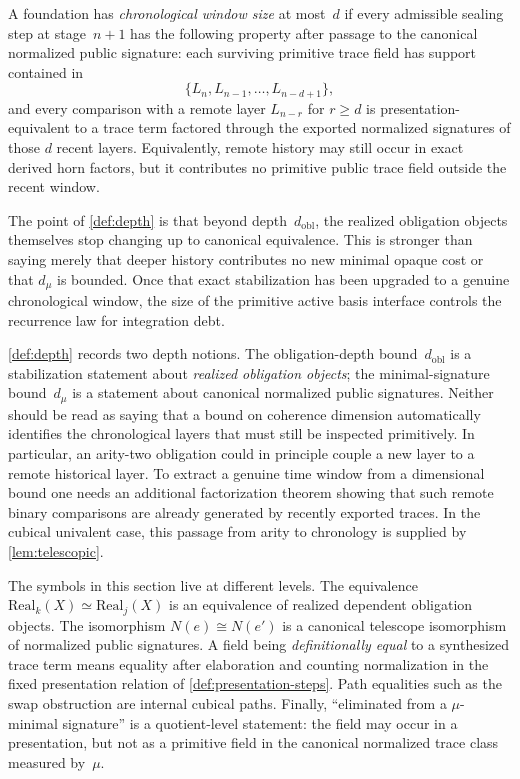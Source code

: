 \documentclass{lmcs}
\newcommand{\Real}{\mathrm{Real}}
\begin{document}
\begin{defi}
\label{def:chronological-window}
A foundation has \emph{chronological window size} at most~$d$ if every admissible sealing step at stage~$n+1$ has the following property after passage to the canonical normalized public signature: each surviving primitive trace field has support contained in
\[
  \{L_n,L_{n-1},\dots,L_{n-d+1}\},
\]
and every comparison with a remote layer $L_{n-r}$ for $r\geq d$ is presentation-equivalent to a trace term factored through the exported normalized signatures of those $d$ recent layers. Equivalently, remote history may still occur in exact derived horn factors, but it contributes no primitive public trace field outside the recent window.
\end{defi}

The point of \autoref{def:depth} is that beyond depth~$d_{\mathrm{obl}}$, the realized obligation objects themselves stop changing up to canonical equivalence. This is stronger than saying merely that deeper history contributes no new minimal opaque cost or that $d_\mu$ is bounded. Once that exact stabilization has been upgraded to a genuine chronological window, the size of the primitive active basis interface controls the recurrence law for integration debt.

\begin{rem}
\label{rem:arity-vs-chronology}
\autoref{def:depth} records two depth notions. The obligation-depth bound~$d_{\mathrm{obl}}$ is a stabilization statement about \emph{realized obligation objects}; the minimal-signature bound~$d_\mu$ is a statement about canonical normalized public signatures. Neither should be read as saying that a bound on coherence dimension automatically identifies the chronological layers that must still be inspected primitively. In particular, an arity-two obligation could in principle couple a new layer to a remote historical layer. To extract a genuine time window from a dimensional bound one needs an additional factorization theorem showing that such remote binary comparisons are already generated by recently exported traces. In the cubical univalent case, this passage from arity to chronology is supplied by \autoref{lem:telescopic}.
\end{rem}

\begin{rem}
\label{rem:equality-conventions}
The symbols in this section live at different levels. The equivalence $\Real_k(X)\simeq\Real_j(X)$ is an equivalence of realized dependent obligation objects. The isomorphism $N(e)\cong N(e')$ is a canonical telescope isomorphism of normalized public signatures. A field being \emph{definitionally equal} to a synthesized trace term means equality after elaboration and counting normalization in the fixed presentation relation of \autoref{def:presentation-steps}. Path equalities such as the swap obstruction are internal cubical paths. Finally, ``eliminated from a $\mu$-minimal signature'' is a quotient-level statement: the field may occur in a presentation, but not as a primitive field in the canonical normalized trace class measured by~$\mu$.
\end{rem}
\end{document}
